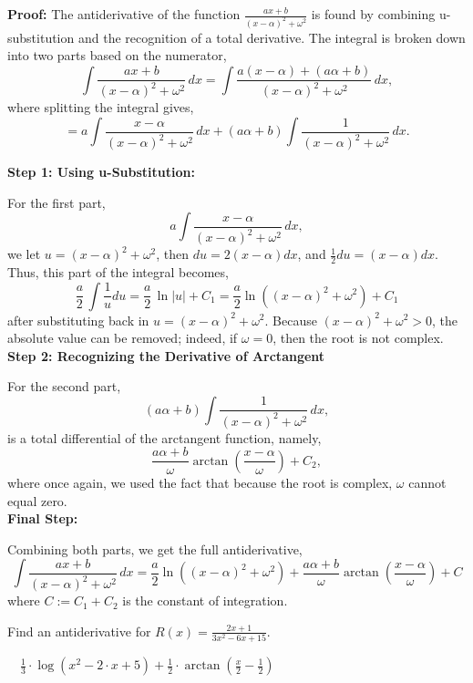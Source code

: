 \textbf{Proof:} The antiderivative of the function \(\frac{ax + b}{(x-\alpha)^2 + \omega^2}\) is found by combining u-substitution and the recognition of a total derivative. The integral is broken down into two parts based on the numerator,
\[
\int \frac{ax + b}{(x-\alpha)^2 + \omega^2} \, dx = \int \frac{a(x-\alpha) + (a\alpha + b)}{(x-\alpha)^2 + \omega^2} \, dx,
\]
where splitting the integral gives,
\[
= a\int \frac{x-\alpha}{(x-\alpha)^2 + \omega^2} \, dx + (a\alpha + b)\int \frac{1}{(x-\alpha)^2 + \omega^2} \, dx.
\]

\textbf{Step 1: Using u-Substitution:}

For the first part,
\[
a\int \frac{x-\alpha}{(x-\alpha)^2 + \omega^2} \, dx,
\]
we let \(u = (x-\alpha)^2 + \omega^2\), then \(du = 2(x-\alpha)dx\), and \(\frac{1}{2}du = (x-\alpha)dx\). Thus, this part of the integral becomes,
\[
\frac{a}{2}\, \int \frac{1}{u} du = \frac{a}{2} \, \ln|u| + C_1 = \frac{a}{2}\ln\left( (x-\alpha)^2 + \omega^2 \right) + C_1
\]
after substituting back in $u = (x-\alpha)^2 + \omega^2$. Because $ (x-\alpha)^2 + \omega^2 > 0$, the absolute value can be removed; indeed, if $\omega = 0$, then the root is not complex.\\

\textbf{Step 2: Recognizing the Derivative of Arctangent} 

For the second part,
\[
(a\alpha + b)\int \frac{1}{(x-\alpha)^2 + \omega^2} \, dx,
\]
is a total differential of the arctangent function, namely,
\[
\frac{a\alpha + b}{\omega}\arctan\left(\frac{x-\alpha}{\omega}\right) + C_2,
\]
where once again, we used the fact that because the root is complex, $\omega$ cannot equal zero.\\

\textbf{Final Step:}

Combining both parts, we get the full antiderivative,
\[
\int \frac{ax + b}{(x-\alpha)^2 + \omega^2} \, dx = \frac{a}{2}\ln \left((x-\alpha)^2 + \omega^2 \right) + \frac{a\alpha + b}{\omega}\arctan\left(\frac{x-\alpha}{\omega}\right) + C
\]
where \(C := C_1 + C_2\) is the constant of integration. 
\Qed

\bigskip

\begin{example} Find an antiderivative for $R(x) = \frac{2x+1}{3 x^2 -6 x + 15}$.    
\end{example}

\solution \Ans ~~$\frac{1}{3}\cdot \log\left( x^{2} - 2 \cdot x + 5 \right) + \frac{1}{2} \cdot \arctan\left( \frac{x}{2} - \frac{1}{2} \right)$\\

